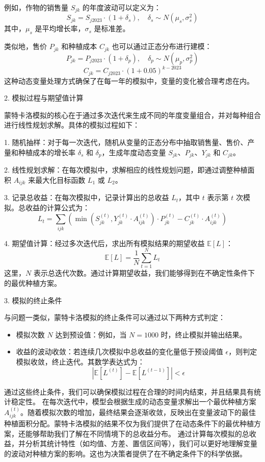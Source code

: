 \documentclass[12pt,a4paper]{nmmcm}
\begin{document}
例如，作物的销售量 $S_{jk}$ 的年度波动可以定义为：
\[
S_{jk} = S_{j2023} \cdot (1 + \delta_s), \quad \delta_s \sim N(\mu_s, \sigma_s^2)
\]
其中，$\mu_s$ 是平均增长率，$\sigma_s$ 是标准差。

类似地，售价 $P_{jk}$ 和种植成本 $C_{jk}$ 也可以通过正态分布进行建模：
\[
P_{jk} = P_{j2023} \cdot (1 + \delta_p), \quad \delta_p \sim N(\mu_p, \sigma_p^2)
\]
\[
C_{jk} = C_{j2023} \cdot (1 + 0.05)^{k-2023}
\]
这种动态变量处理方式确保了在每一年的模拟中，变量的变化被合理考虑在内。

 2. 模拟过程与期望值计算

蒙特卡洛模拟的核心在于通过多次迭代来生成不同的年度变量组合，并对每种组合进行线性规划求解。具体的模拟过程如下：

1. 随机抽样：对于每一次迭代，随机从变量的正态分布中抽取销售量、售价、产量和种植成本的增长率 $\delta_s$ 和 $\delta_p$，生成年度动态变量 $S_{jk}$、$P_{jk}$、$Y_{jk}$ 和 $C_{jk}$。

2. 线性规划求解：在每次模拟中，求解相应的线性规划问题，即通过调整种植面积 $A_{ijk}$ 来最大化目标函数 $L_1$ 或 $L_2$。

3. 记录总收益：在每次模拟中，记录计算出的总收益 $L_t$，其中 $t$ 表示第 $t$ 次模拟。总收益的计算公式为：
   \[
   L_t = \sum_{ijk} \left( \min(S_{jk}^{(t)}, Y_{jk}^{(t)} \cdot A_{ijk}^{(t)}) \cdot P_{jk}^{(t)} - C_{jk}^{(t)} \cdot A_{ijk}^{(t)} \right)
   \]

4. 期望值计算：经过多次迭代后，求出所有模拟结果的期望收益 $\mathbb{E}[L]$：
   \[
   \mathbb{E}[L] = \frac{1}{N} \sum_{t=1}^{N} L_t
   \]
   这里，$N$ 表示总迭代次数。通过计算期望收益，我们能够得到在不确定性条件下的最优种植方案。

 3. 模拟的终止条件

与问题一类似，蒙特卡洛模拟的终止条件可以通过以下两种方式判定：
\begin{itemize}
  \item 模拟次数 $N$ 达到预设值：例如，当 $N=1000$ 时，终止模拟并输出结果。
  \item 收益的波动收敛：若连续几次模拟中总收益的变化量低于预设阈值 $\epsilon$，则判定模拟收敛，终止迭代。其数学表达式为：
  \[
  |\mathbb{E}[L^{(t)}] - \mathbb{E}[L^{(t-1)}]| < \epsilon
  \]
\end{itemize}

通过这些终止条件，我们可以确保模拟过程在合理的时间内结束，并且结果具有统计稳定性。
在每次迭代中，模型会根据生成的动态变量求解出一个最优种植方案 $A_{ijk}^{(t)}$。随着模拟次数的增加，最终结果会逐渐收敛，反映出在变量波动下的最佳种植面积分配。蒙特卡洛模拟的结果不仅为我们提供了在动态条件下的最优种植方案，还能够帮助我们了解在不同情境下的总收益分布。
通过计算每次模拟的总收益，并分析其统计特性（如均值、方差、置信区间等），我们可以更好地理解变量的波动对种植方案的影响。这也为决策者提供了在不确定条件下的科学依据。
\end{document}
